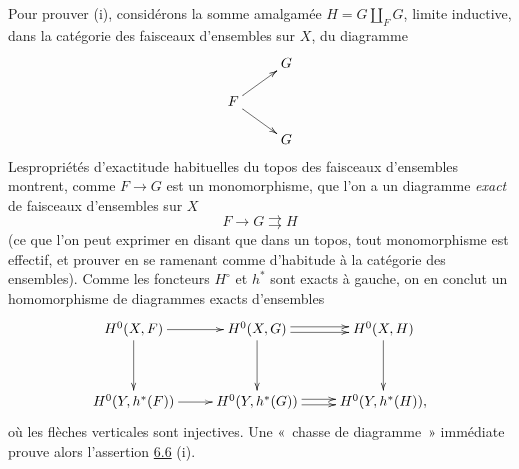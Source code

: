 \documentclass[10pt]{../fichiers-configuration-latex/smfart}
\begin{document}
Pour prouver (i), considérons la somme amalgamée $H=G\amalg_F G$,
limite inductive, dans la catégorie des faisceaux d'ensembles sur $X$,
du diagramme
$$
\xymatrix@R=.5cm{
  & G\\
F \ar[ru] \ar[rd]&\\
  & G
}
$$
Les\pageoriginale propriétés d'exactitude habituelles du topos des
faisceaux d'ensembles montrent, comme $F\rightarrow G$ est un
monomorphisme, que l'on a un diagramme \emph{exact} de faisceaux
d'ensembles sur $X$
$$
F\to G\rightrightarrows H
$$
(ce que l'on peut exprimer en disant que dans un topos, tout
monomorphisme est effectif, et prouver en se ramenant comme d'habitude
à la catégorie des ensembles). Comme les foncteurs $H^{\circ}$ et
$h^{\ast}$ sont exacts à gauche, on en conclut un homomorphisme de
diagrammes exacts d'ensembles
$$
\xymatrix@R=1.25cm{
H^{0}(X,F) \ar[r]\ar[d]& H^{0}(X,G)  \ar[d]\ar@<2pt>[r]\ar@<-2pt>[r]& H^{0}(X,H)\ar[d]\\
H^{0}(Y,h^{\ast}(F)) \ar[r]& H^{0}(Y,h^{\ast}(G)) \ar@<2pt>[r]\ar@<-2pt>[r]& H^{0}(Y,h^{\ast}(H)),
}
$$
où les flèches verticales sont injectives. Une « chasse de
diagramme » immédiate prouve alors l'assertion \hyperref[XII.cor6.6]{6.6} (i).
\end{document}
